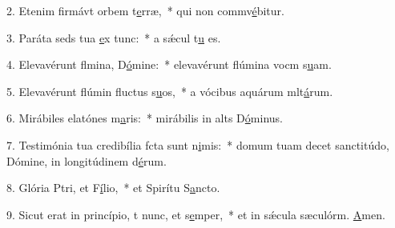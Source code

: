 2. Etenim firmávt orbem t\uline{e}rræ,~* qui non commv\uline{é}bitur.\par 
3. Paráta seds tua \uline{e}x tunc:~* a sǽcul t\uline{u} es.\par 
4. Elevavérunt flmina, D\uline{ó}mine:~* elevavérunt flúmina vocm s\uline{u}am.\par 
5. Elevavérunt flúmin fluctus s\uline{u}os,~* a vócibus aquárum mlt\uline{á}rum.\par 
6. Mirábiles elatónes m\uline{a}ris:~* mirábilis in alts D\uline{ó}minus.\par 
7. Testimónia tua credibília fcta sunt n\uline{i}mis:~* domum tuam decet sanctitúdo, Dómine, in longitúdinem d\uline{é}rum.\par 
8. Glória Ptri, et F\uline{í}lio,~* et Spirítu S\uline{a}ncto.\par 
9. Sicut erat in princípio, t nunc, et s\uline{e}mper,~* et in sǽcula sæculórm. \uline{A}men.\par 
